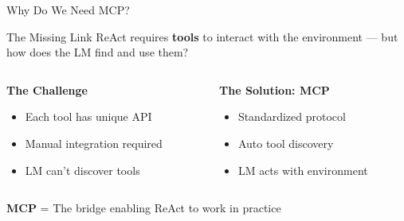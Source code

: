 \documentclass[aspectratio=169]{beamer}
\begin{document}
\begin{frame}{Why Do We Need MCP?}
  \begin{block}{The Missing Link}
    ReAct requires \textbf{tools} to interact with the environment --- but how does the LM find and use them?
  \end{block}

  \vspace{0.5cm}

  \begin{columns}[T]
    \begin{column}{0.48\textwidth}
      \centering
      \large\bfseries
      \textcolor{conesaOrange}{The Challenge}

      \vspace{0.3cm}
      \normalsize

      \begin{itemize}
        \item Each tool has unique API
        \item Manual integration required
        \item LM can't discover tools
      \end{itemize}
    \end{column}
    \begin{column}{0.48\textwidth}
      \centering
      \large\bfseries
      \textcolor{conesaTeal}{The Solution: MCP}

      \vspace{0.3cm}
      \normalsize

      \begin{itemize}
        \item Standardized protocol
        \item Auto tool discovery
        \item LM acts with environment
      \end{itemize}
    \end{column}
  \end{columns}

  \vspace{0.5cm}
  \centering
  \normalsize
  \textbf{MCP} = The bridge enabling ReAct to work in practice
\end{frame}
\end{document}
